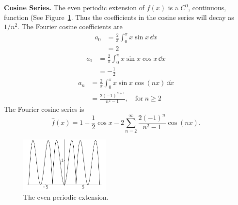 {%
\begin{Solution}
  \textbf{Cosine Series.}
  The even periodic extension of $f(x)$ is a $C^0$, continuous, function
  (See Figure~\ref{xsinx_cos_ser}.
  Thus the coefficients in the cosine series will decay as $1/n^2$.
  The Fourier cosine coefficients are
  \begin{align*}
    a_0     &= \frac{2}{\pi} \int_0^\pi x \sin x \,\dd x \\
    &= 2
  \end{align*}
  \begin{align*}
    a_1     &= \frac{2}{\pi} \int_0^\pi x \sin x \cos x \,\dd x \\
    &= - \frac{1}{2}
  \end{align*}
  \begin{align*}
    a_n     &= \frac{2}{\pi} \int_0^\pi x \sin x \cos(n x) \,\dd x \\
    &= \frac{2 (-1)^{n+1}}{n^2-1}, \quad \mathrm{for}\ n \geq 2
  \end{align*}
  The Fourier cosine series is
  \[
  \boxed{
    \hat{f}(x) = 1 - \frac{1}{2} \cos x 
    -2 \sum_{n=2}^\infty \frac{2 (-1)^n}{n^2-1} \cos(n x).
    }
  \]
  \begin{figure}[h!]
    \begin{center}
      \includegraphics[width=0.4\textwidth]{ode/fourier_series/xsinx_cos_ser}
    \end{center}
    \caption{The even periodic extension.}
    \label{xsinx_cos_ser}
  \end{figure}





\end{Solution}}
